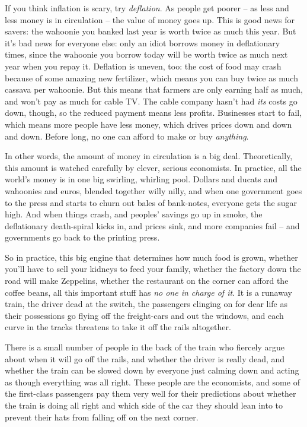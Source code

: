 If you think inflation is scary, try \emph{deflation}. As people
get poorer -- as less and less money is in circulation -- the value
of money goes up. This is good news for savers: the wahoonie you
banked last year is worth twice as much this year. But it's bad
news for everyone else: only an idiot borrows money in deflationary
times, since the wahoonie you borrow today will be worth twice as
much next year when you repay it. Deflation is uneven, too: the
cost of food may crash because of some amazing new fertilizer,
which means you can buy twice as much cassava per wahoonie. But
this means that farmers are only earning half as much, and won't
pay as much for cable TV. The cable company hasn't had \emph{its}
costs go down, though, so the reduced payment means less profits.
Businesses start to fail, which means more people have less money,
which drives prices down and down and down. Before long, no one can
afford to make or buy \emph{anything}.

In other words, the amount of money in circulation is a big deal.
Theoretically, this amount is watched carefully by clever, serious
economists. In practice, all the world's money is in one big
swirling, whirling pool. Dollars and ducats and wahoonies and
euros, blended together willy nilly, and when one government goes
to the press and starts to churn out bales of bank-notes, everyone
gets the sugar high. And when things crash, and peoples' savings go
up in smoke, the deflationary death-spiral kicks in, and prices
sink, and more companies fail -- and governments go back to the
printing press.

So in practice, this big engine that determines how much food is
grown, whether you'll have to sell your kidneys to feed your
family, whether the factory down the road will make Zeppelins,
whether the restaurant on the corner can afford the coffee beans,
all this important stuff has \emph{no one in charge of it}. It is a
runaway train, the driver dead at the switch, the passengers
clinging on for dear life as their possessions go flying off the
freight-cars and out the windows, and each curve in the tracks
threatens to take it off the rails altogether.

There is a small number of people in the back of the train who
fiercely argue about when it will go off the rails, and whether the
driver is really dead, and whether the train can be slowed down by
everyone just calming down and acting as though everything was all
right. These people are the economists, and some of the first-class
passengers pay them very well for their predictions about whether
the train is doing all right and which side of the car they should
lean into to prevent their hats from falling off on the next
corner.

